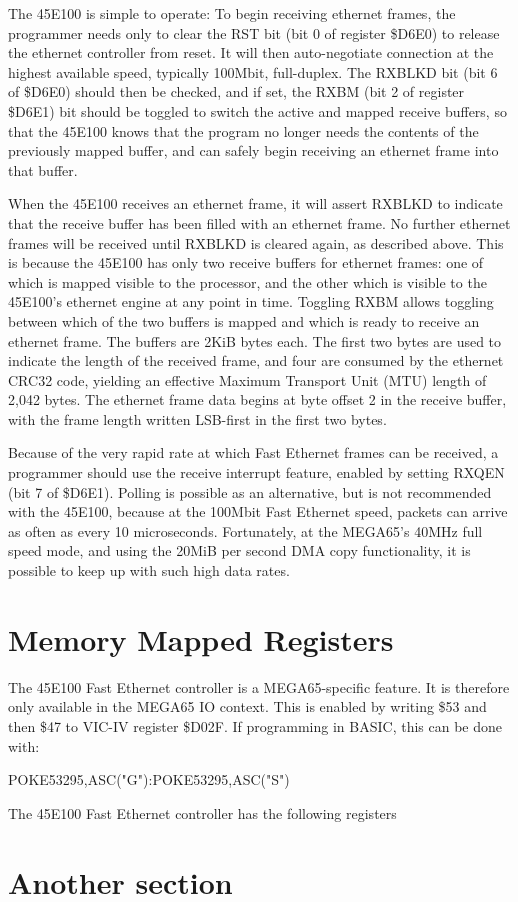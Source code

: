 The 45E100 is simple to operate: To begin receiving ethernet frames, the programmer
needs only to clear the RST bit (bit 0 of register \$D6E0) to release the
ethernet controller from reset.  It will then auto-negotiate connection at
the highest available speed, typically 100Mbit, full-duplex.  The RXBLKD bit (bit 6 of \$D6E0)
should then be checked, and if set, the RXBM (bit 2 of register \$D6E1) bit should be toggled to switch
the active and mapped receive buffers, so that the 45E100 knows that the
program no longer needs the contents of the previously mapped buffer, and can
safely begin receiving an ethernet frame into that buffer.

When the 45E100 receives an ethernet frame, it will assert RXBLKD to indicate that the receive
buffer has been filled with an ethernet frame.  No further ethernet frames will be received until
RXBLKD is cleared again, as described above. This is because the 45E100 has only two receive buffers
for ethernet frames: one of which is mapped visible to the processor, and the other which is visible
to the 45E100's ethernet engine at any point in time.  Toggling RXBM allows toggling between which
of the two buffers is mapped and which is ready to receive an ethernet frame.  The buffers are 2KiB
bytes each.  The first two bytes are used to indicate the length of the received frame, and four
are consumed by the ethernet CRC32 code, yielding an effective Maximum Transport Unit (MTU) length
of 2,042 bytes.  The ethernet frame data begins at byte offset 2 in the receive buffer, with the
frame length written LSB-first in the first two bytes.

Because of the very rapid rate at which Fast Ethernet frames can be received, a programmer should use the
receive interrupt feature, enabled by setting RXQEN (bit 7 of \$D6E1).  Polling is possible as an alternative, but
is not recommended with the 45E100, because at the 100Mbit Fast Ethernet speed, packets can arrive
as often as every 10 microseconds.  Fortunately, at the MEGA65's 40MHz full speed mode, and using
the 20MiB per second DMA copy functionality, it is possible to keep up with such high data rates.


\section{Memory Mapped Registers}

The 45E100 Fast Ethernet controller is a MEGA65-specific feature.
It is therefore only available in the MEGA65 IO context.
This is enabled by writing \$53 and then \$47 to VIC-IV register \$D02F.
If programming in BASIC, this can be done with:

\begin{screenoutput}
POKE53295,ASC("G"):POKE53295,ASC("S")
\end{screenoutput}

The 45E100 Fast Ethernet controller has the following registers



\section{Another section}
